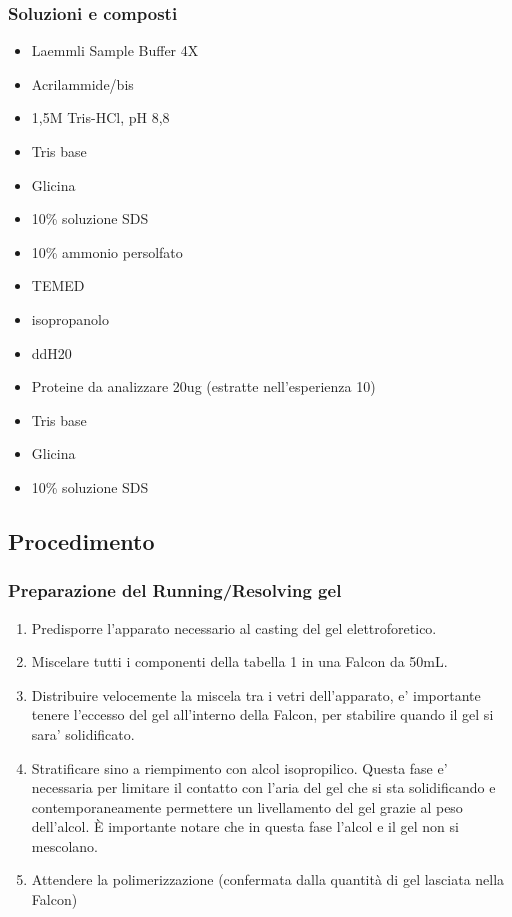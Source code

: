 \subsubsection{Soluzioni e composti}

\begin{itemize}
\item Laemmli Sample Buffer 4X
\item Acrilammide/bis
\item 1,5M Tris-HCl, pH 8,8
\item Tris base
\item Glicina
\item 10\% soluzione SDS
\item 10\% ammonio persolfato
\item TEMED
\item isopropanolo
\item ddH20
\item Proteine da analizzare 20ug (estratte nell'esperienza 10)
\item Tris base
\item Glicina
\item 10\% soluzione SDS
\end{itemize}


\subsection{Procedimento}

\subsubsection{Preparazione del Running/Resolving gel}

\begin{enumerate}
	\item Predisporre l'apparato necessario al casting del gel elettroforetico.

	\item Miscelare tutti i componenti della tabella 1 in una Falcon da 50mL.

	\item Distribuire velocemente la miscela tra i vetri dell'apparato, e' importante
	tenere l'eccesso del gel all'interno della Falcon, per stabilire quando il gel
	si sara' solidificato.

	\item Stratificare sino a riempimento con alcol isopropilico.
	Questa fase e' necessaria per limitare il contatto con l'aria
	del gel che si sta solidificando e contemporaneamente	permettere
	un livellamento del gel grazie al peso dell'alcol.
	\`E importante notare che in questa fase l'alcol e
	il gel non si mescolano.

	\item Attendere la polimerizzazione (confermata dalla quantit\`a di
	gel lasciata nella Falcon)
\end{enumerate}

